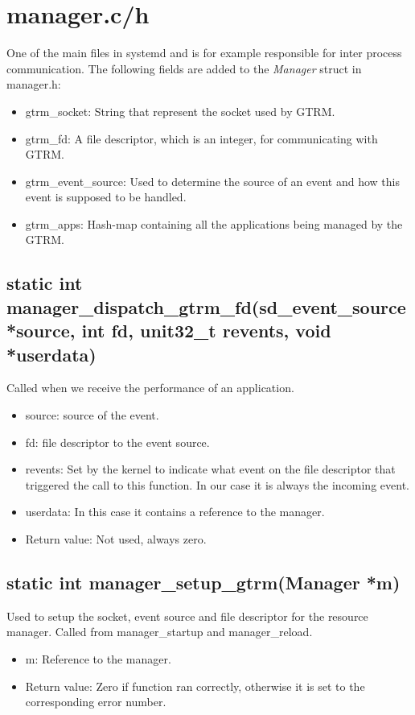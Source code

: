 \documentclass[nobiblatex]{LTHthesis}
\begin{document}
\section{manager.c/h}
One of the main files in systemd and is for example responsible for inter process communication. The following fields are added to the \emph{Manager} struct in manager.h:
\begin{itemize}
\item gtrm\_socket: String that represent the socket used by GTRM.
\item gtrm\_fd: A file descriptor, which is an integer, for communicating with GTRM.
\item gtrm\_event\_source: Used to determine the source of an event and how this event is supposed to be handled.
\item gtrm\_apps: Hash-map containing all the applications being managed by the GTRM.
\end{itemize}

\subsection{static int manager\_dispatch\_gtrm\_fd(sd\_event\_source *source, int fd, unit32\_t revents, void *userdata)}
Called when we receive the performance of an application.
\begin{itemize}
\item source: source of the event.
\item fd: file descriptor to the event source.
\item revents: Set by the kernel to indicate what event on the file descriptor that triggered the call to this function. In our case it is always the incoming event.
\item userdata: In this case it contains a reference to the manager.
\item Return value: Not used, always zero.
\end{itemize}

\subsection{static int manager\_setup\_gtrm(Manager *m)}
Used to setup the socket, event source and file descriptor for the resource manager. Called from manager\_startup and manager\_reload.
\begin{itemize}
\item m: Reference to the manager.
\item Return value: Zero if function ran correctly, otherwise it is set to the corresponding error number.
\end{itemize}
\end{document}
